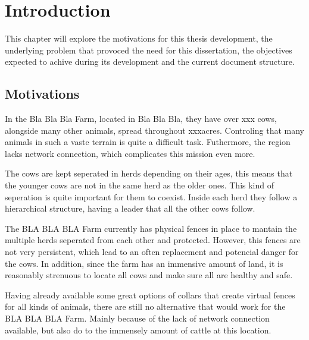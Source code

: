 
%

\chapter{Introduction}
\label{cha:introduction}
This chapter will explore the motivations for this thesis development, the
underlying problem that provoced the need for this dissertation, the objectives
expected to achive during its development and the current document structure.

\section{Motivations}
\label{sec:motivations}
In the Bla Bla Bla Farm, located in Bla Bla Bla, they have over xxx cows,
alongside many other animals, spread throughout xxxacres. Controling that many animals
in such a vaste terrain is quite a difficult task. Futhermore, the region lacks
network connection, which complicates this mission even more.

The cows are kept seperated in herds depending on their ages, this means that the
younger cows are not in the same herd as the older ones. This kind of seperation
is quite important for them to coexist. Inside each herd they follow a hierarchical
structure, having a leader that all the other cows follow.

The BLA BLA BLA Farm currently has physical fences in place to mantain the multiple
herds seperated from each other and protected. However, this fences are
not very persistent, which lead to an often replacement and potencial danger for
the cows. In addition, since the farm has an immensive amount of land, it is
reasonably strenuous to locate all cows and make sure all are healthy and safe.

Having already available some great options of collars that create virtual fences
for all kinds of animals, there are still no alternative that would work for
the BLA BLA BLA Farm. Mainly because of the lack of network connection
available, but also do to the immensely amount of cattle at this location.



